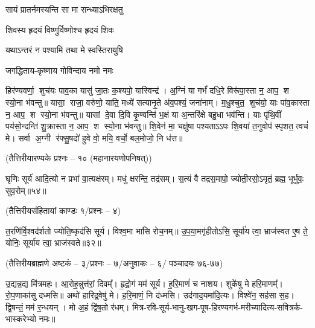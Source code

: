 {सायं प्रातर्नमस्यन्ति सा मा सन्ध्याऽभिरक्षतु}

{शिवस्य हृदयं विष्णुर्विष्णोश्च हृदयं शिवः}

{यथाऽन्तरं न पश्यामि तथा मे स्वस्तिरायुषि}

{जगद्धिताय-कृष्णाय गोविन्दाय नमो नमः}

 

\closesection

हिर॑ण्यवर्णा॒ शुच॑यः पाव॒का यासु॑ जा॒तः क॒श्यपो॒ यास्विन्द्र॑।
अ॒ग्निं या गर्भं॑ दधि॒रे विरू॑पा॒स्ता न॒ आप॒ श स्यो॒ना भ॑वन्तु॥ 
यासा॒ राजा॒ वरु॑णो॒ याति॒ मध्ये॑ सत्यानृ॒ते अ॑व॒पश्यं॒ जना॑नाम्।
म॒धु॒श्चुत॒ शुच॑यो॒ याः पा॑व॒कास्ता न॒ आप॒ श स्यो॒ना भ॑वन्तु॥ 
यासां दे॒वा दि॒वि कृ॒ण्वन्ति॑ भ॒क्षं या अ॒न्तरि॑क्षे बहु॒धा भव॑न्ति।
याः पृ॑थि॒वीं पय॑सो॒न्दन्ति॑ शु॒क्रास्ता न॒ आप॒ श स्यो॒ना भ॑वन्तु॥ 
शि॒वेन॑ मा॒ चक्षु॑षा पश्यताऽऽपः शि॒वया॑ त॒नुवोप॑ स्पृशत॒ त्वचं॑ मे।
सर्वा अ॒ग्नी र॑फ्सु॒षदो॑ हुवे वो॒ मयि॒ वर्चो॒ बल॒मोजो॒ नि ध॑त्त॥
\clearpage

 
\clearpage

 


\centerline{\scriptsize (तैत्तिरीयारण्यके प्रश्नः – १० (महानारयणोपनिषत्))}

घृणिः सूर्य॑ आदि॒त्यो न प्रभा॑ वा॒त्यक्ष॑रम्। 
मधु॑ क्षरन्ति॒ तद्र॑सम्। 
स॒त्यं वै तद्रस॒मापो॒ ज्योती॒रसो॒ऽमृतं॒ ब्रह्म॒ भूर्भुवः॒ सुव॒रोम्॥५४॥

\begin{minipage}{\linewidth}
\centerline{\scriptsize (तैत्तिरीयसंहितायां काण्डः १/प्रश्नः – ४)}
त॒रणि॑र्वि॒श्वद॑र्\mbox{}शतो ज्योति॒ष्कृद॑सि सूर्य। विश्व॒मा भा॑सि रोच॒नम्॥ उ॒प॒या॒मगृ॑हीतो\-ऽसि॒ सूर्या॑य त्वा॒ भ्राज॑स्वत ए॒ष ते॒ योनिः॒ सूर्या॑य त्वा॒ भ्राज॑स्वते॥३२॥
\end{minipage}

\begin{minipage}{\linewidth}
\centerline{\scriptsize (तैत्तिरीयब्राह्मणे अष्टकं – ३/प्रश्नः – ७/अनुवाकः – ६/ पञ्चादयः ७६-७७)}

उ॒द्यन्न॒द्य मि॑त्रमहः। 
आ॒रोह॒न्नुत्त॑रां॒ दिवम्᳚।
हृ॒द्रो॒गं मम॑ सूर्य।
ह॒रि॒माणं॑ च नाशय।
शुके॑षु मे हरि॒माणम्᳚।
रो॒प॒णाका॑सु दध्मसि॥
अथो॑ हारिद्र॒वेषु॑ मे।
ह॒रि॒माणं॒ नि द॑ध्मसि।
उद॑गाद॒यमा॑दि॒त्यः।
विश्वे॑न॒ सह॑सा स॒ह।
द्वि॒षन्तं॒ मम॑ र॒न्धयन्।
मो अ॒हं द्वि॑ष॒तो र॑धम्।
मित्र-रवि-सूर्य-भानु-खग-पूष-हिरण्यगर्भ-मरीच्यादित्य-सवित्रर्क-भास्करेभ्यो नमः॥
\end{minipage}

